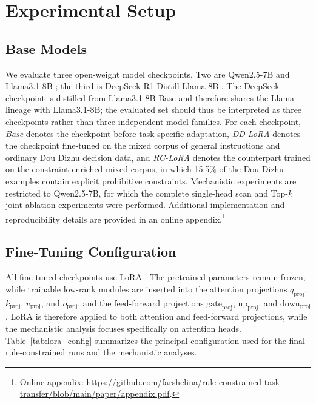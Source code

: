 \section{Experimental Setup}
\label{sec:experimental_setup}

\subsection{Base Models}
\label{sec:base_models}

We evaluate three open-weight model checkpoints. Two are Qwen2.5-7B \cite{qwen2024qwen25} and Llama3.1-8B \cite{grattafiori2024llama3}; the third is DeepSeek-R1-Distill-Llama-8B \cite{deepseek2025r1}. The DeepSeek checkpoint is distilled from Llama3.1-8B-Base and therefore shares the Llama lineage with Llama3.1-8B; the evaluated set should thus be interpreted as three checkpoints rather than three independent model families. For each checkpoint, \emph{Base} denotes the checkpoint before task-specific adaptation, \emph{DD-LoRA} denotes the checkpoint fine-tuned on the mixed corpus of general instructions and ordinary Dou Dizhu decision data, and \emph{RC-LoRA} denotes the counterpart trained on the constraint-enriched mixed corpus, in which 15.5\% of the Dou Dizhu examples contain explicit prohibitive constraints. Mechanistic experiments are restricted to Qwen2.5-7B, for which the complete single-head scan and Top-$k$ joint-ablation experiments were performed. Additional implementation and reproducibility details are provided in an online appendix.\footnote{\raggedright\samepage Online appendix: \url{https://github.com/farshelina/rule-constrained-task-transfer/blob/main/paper/appendix.pdf}.}

\subsection{Fine-Tuning Configuration}
\label{sec:finetuning_configuration}

All fine-tuned checkpoints use LoRA \cite{hu2022lora}. The pretrained parameters remain frozen, while trainable low-rank modules are inserted into the attention projections $q_{\mathrm{proj}}$, $k_{\mathrm{proj}}$, $v_{\mathrm{proj}}$, and $o_{\mathrm{proj}}$, and the feed-forward projections $\mathrm{gate}_{\mathrm{proj}}$, $\mathrm{up}_{\mathrm{proj}}$, and $\mathrm{down}_{\mathrm{proj}}$. LoRA is therefore applied to both attention and feed-forward projections, while the mechanistic analysis focuses specifically on attention heads. Table~\ref{tab:lora_config} summarizes the principal configuration used for the final rule-constrained runs and the mechanistic analyses.

